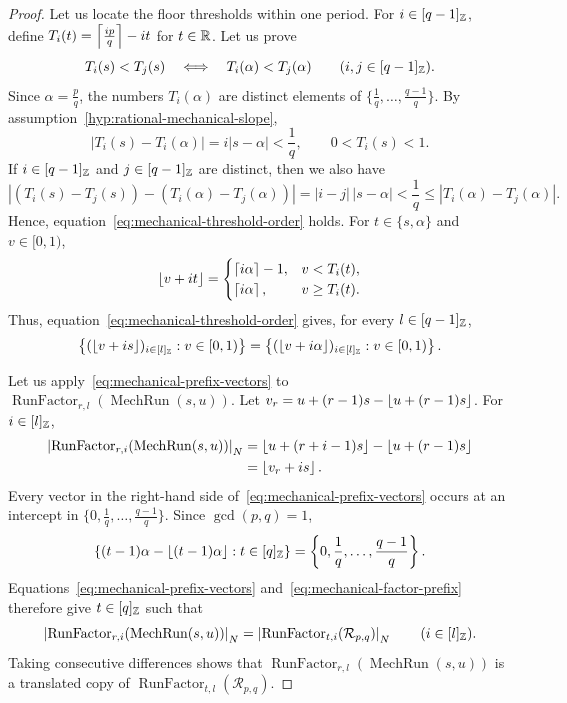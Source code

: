 \begin{proof}
 Let us locate the floor thresholds within one period.
For $i\in[q-1]_{\mathbb Z}$, define
$T_i(t)=\left\lceil\frac{ip}{q}\right\rceil-it$ for $t\in\mathbb R$.
Let us prove
\begin{equation}\label{eq:mechanical-threshold-order}
 T_i(s)<T_j(s)\quad\Longleftrightarrow\quad T_i(\alpha)<T_j(\alpha)
 \qquad(i,j\in[q-1]_{\mathbb Z}).
\end{equation}
Since $\alpha=\frac pq$, the numbers $T_i(\alpha)$
are distinct elements of $\{\frac1q,\ldots,\frac{q-1}{q}\}$.
By assumption~\ref{hyp:rational-mechanical-slope},
\[
 |T_i(s)-T_i(\alpha)|=i|s-\alpha|<\frac1q,
 \qquad 0<T_i(s)<1.
\]
If $i\in[q-1]_{\mathbb Z}$ and $j\in[q-1]_{\mathbb Z}$ are distinct, then we also have
\[
 \left|(T_i(s)-T_j(s))-(T_i(\alpha)-T_j(\alpha))\right|
 =|i-j|\,|s-\alpha|<\frac1q\le|T_i(\alpha)-T_j(\alpha)|.
\]
Hence, equation~\eqref{eq:mechanical-threshold-order} holds.
For $t\in\{s,\alpha\}$ and $v\in[0,1)$,
\[
 \left\lfloor v+it\right\rfloor=
 \begin{cases}
 \left\lceil i\alpha\right\rceil-1,&v<T_i(t),\\
 \left\lceil i\alpha\right\rceil,&v\ge T_i(t).
 \end{cases}
\]
Thus, equation~\eqref{eq:mechanical-threshold-order} gives, for every $l\in[q-1]_{\mathbb Z}$,
\begin{equation}\label{eq:mechanical-prefix-vectors}
 \left\{(\left\lfloor v+is\right\rfloor)_{i\in[l]_{\mathbb Z}}:v\in[0,1)\right\}
 =\left\{(\left\lfloor v+i\alpha\right\rfloor)_{i\in[l]_{\mathbb Z}}:v\in[0,1)\right\}.
\end{equation}

Let us apply~\eqref{eq:mechanical-prefix-vectors} to $\operatorname{RunFactor}_{r,l}(\operatorname{MechRun}(s,u))$.
Let $v_r=u+(r-1)s-\left\lfloor u+(r-1)s\right\rfloor$.
For $i\in[l]_{\mathbb Z}$,
\begin{equation}\label{eq:mechanical-factor-prefix}
\begin{aligned}
 \left|\operatorname{RunFactor}_{r,i}(\operatorname{MechRun}(s,u))\right|_N
 &=\left\lfloor u+(r+i-1)s\right\rfloor-\left\lfloor u+(r-1)s\right\rfloor\\
 &=\left\lfloor v_r+is\right\rfloor.
\end{aligned}
\end{equation}
Every vector in the right-hand side of~\eqref{eq:mechanical-prefix-vectors} occurs at an intercept in
$\{0,\frac1q,\ldots,\frac{q-1}{q}\}$.
Since $\gcd(p,q)=1$,
\[
 \left\{(t-1)\alpha-\left\lfloor(t-1)\alpha\right\rfloor:t\in[q]_{\mathbb Z}\right\}
 =\left\{0,\frac1q,\ldots,\frac{q-1}{q}\right\}.
\]
Equations~\eqref{eq:mechanical-prefix-vectors} and~\eqref{eq:mechanical-factor-prefix} therefore give
$t\in[q]_{\mathbb Z}$ such that
\[
 \left|\operatorname{RunFactor}_{r,i}(\operatorname{MechRun}(s,u))\right|_N
 =\left|\operatorname{RunFactor}_{t,i}(\mathcal R_{p,q})\right|_N
 \qquad(i\in[l]_{\mathbb Z}).
\]
Taking consecutive differences shows that
$\operatorname{RunFactor}_{r,l}(\operatorname{MechRun}(s,u))$
is a translated copy of $\operatorname{RunFactor}_{t,l}(\mathcal R_{p,q})$.


\end{proof}
